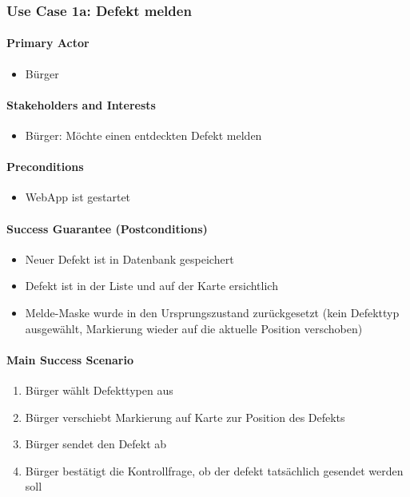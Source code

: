 \subsubsection{Use Case 1a: Defekt melden}
\paragraph{Primary Actor}
\begin{itemize}
\item Bürger
\end{itemize}

\paragraph{Stakeholders and Interests}
\begin{itemize}
\item Bürger: Möchte einen entdeckten Defekt melden
\end{itemize}

\paragraph{Preconditions}
\begin{itemize}
\item WebApp ist gestartet
\end{itemize}

\paragraph{Success Guarantee (Postconditions)}
\begin{itemize}
\item Neuer Defekt ist in Datenbank gespeichert
\item Defekt ist in der Liste und auf der Karte ersichtlich
\item Melde-Maske wurde in den Ursprungszustand zurückgesetzt (kein Defekttyp ausgewählt, Markierung wieder auf die aktuelle Position verschoben)
\end{itemize}

\paragraph{Main Success Scenario}
\begin{enumerate}
\item Bürger wählt Defekttypen aus
\item Bürger verschiebt Markierung auf Karte zur Position des Defekts
\item Bürger sendet den Defekt ab
\item Bürger bestätigt die Kontrollfrage, ob der defekt tatsächlich gesendet werden soll
\end{enumerate}

